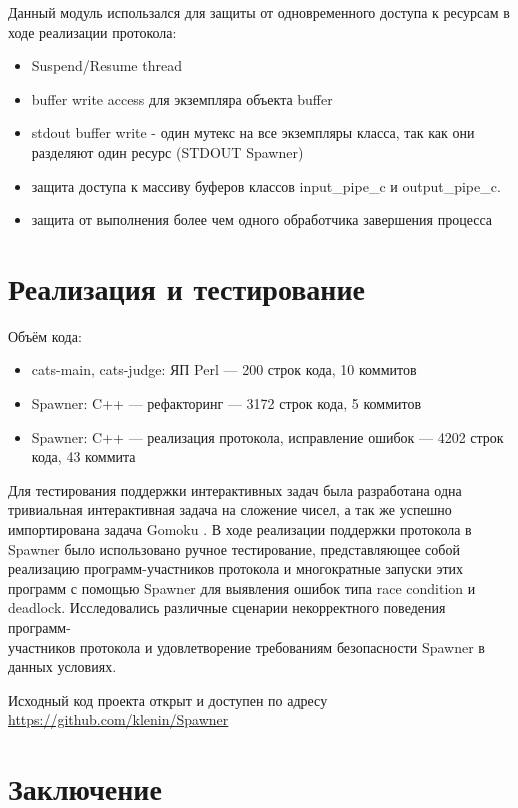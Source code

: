 \documentclass{imcs}
\begin{document}
Данный модуль использался для защиты от одновременного доступа к ресурсам в ходе реализации протокола:
\begin{itemize}
\item Suspend/Resume thread
\item buffer write access для экземпляра объекта buffer
\item stdout buffer write - один мутекс на все экземпляры класса, так как они разделяют один ресурс (STDOUT Spawner)
\item защита доступа к массиву буферов классов input\_pipe\_c и output\_pipe\_c.
\item защита от выполнения более чем одного обработчика завершения процесса
\end{itemize}

\section{Реализация и тестирование}
Объём кода:
\begin{itemize}
\item cats-main, cats-judge: ЯП Perl — 200 строк кода, 10 коммитов
\item Spawner: C++ — рефакторинг — 3172 строк кода, 5 коммитов
\item Spawner: C++ — реализация протокола, исправление ошибок — 4202 строк кода, 43 коммита
\end{itemize}

Для тестирования поддержки интерактивных задач была разработана одна тривиальная интерактивная задача на сложение чисел, а так же успешно импортирована задача Gomoku \cite{gomoku}. В ходе реализации поддержки протокола в Spawner было использовано ручное тестирование, представляющее собой реализацию программ-участников протокола и многократные запуски этих программ с помощью Spawner для выявления ошибок типа race condition и deadlock. Исследовались различные сценарии некорректного поведения программ-\\участников протокола и удовлетворение требованиям безопасности Spawner в данных условиях.

Исходный код проекта открыт и доступен по адресу \url{https://github.com/klenin/Spawner}

\pagebreak

\section*{Заключение}
\end{document}
